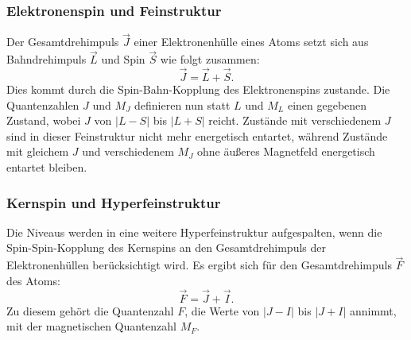 \subsubsection{Elektronenspin und Feinstruktur}
Der Gesamtdrehimpuls $\vec{J}$ einer Elektronenhülle eines Atoms setzt sich aus Bahndrehimpuls $\vec{L}$ und Spin $\vec{S}$ wie folgt zusammen:
\begin{equation*}
  \vec{J} = \vec{L} + \vec{S} \text{.}
\end{equation*}
Dies kommt durch die Spin-Bahn-Kopplung des Elektronenspins zustande.
Die Quantenzahlen $J$ und $M_J$ definieren nun statt $L$ und $M_L$ einen gegebenen Zustand, wobei $J$ von $\lvert L - S \rvert$ bis $\lvert L + S \rvert$ reicht. Zustände mit verschiedenem $J$ sind in dieser Feinstruktur nicht mehr energetisch entartet, während Zustände mit gleichem $J$ und verschiedenem $M_J$ ohne äußeres Magnetfeld energetisch entartet bleiben.

\subsubsection{Kernspin und Hyperfeinstruktur}
Die Niveaus werden in eine weitere Hyperfeinstruktur aufgespalten, wenn die Spin-Spin-Kopplung des Kernspins an den Gesamtdrehimpuls der Elektronenhüllen berücksichtigt wird. Es ergibt sich für den Gesamtdrehimpuls $\vec{F}$ des Atoms:
\begin{equation*}
  \vec{F} = \vec{J} + \vec{I} \text{.}
\end{equation*}
Zu diesem gehört die Quantenzahl $F$, die Werte von $\lvert J - I \rvert$ bis $\lvert J + I \rvert$ annimmt, mit der magnetischen Quantenzahl $M_F$. 

